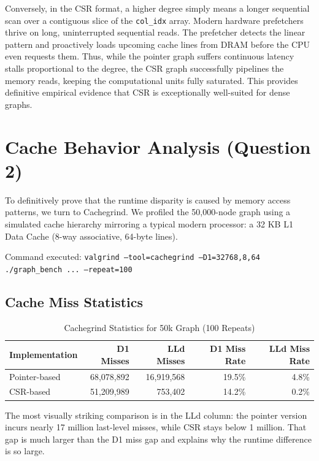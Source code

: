 \documentclass[11pt]{article}
\begin{document}
Conversely, in the CSR format, a higher degree simply means a longer sequential scan over a contiguous slice of the \texttt{col\_idx} array. Modern hardware prefetchers thrive on long, uninterrupted sequential reads. The prefetcher detects the linear pattern and proactively loads upcoming cache lines from DRAM before the CPU even requests them. Thus, while the pointer graph suffers continuous latency stalls proportional to the degree, the CSR graph successfully pipelines the memory reads, keeping the computational units fully saturated. This provides definitive empirical evidence that CSR is exceptionally well-suited for dense graphs.

\section{Cache Behavior Analysis (Question 2)}

To definitively prove that the runtime disparity is caused by memory access patterns, we turn to Cachegrind. We profiled the 50,000-node graph using a simulated cache hierarchy mirroring a typical modern processor: a 32 KB L1 Data Cache (8-way associative, 64-byte lines).

Command executed:
\texttt{valgrind --tool=cachegrind --D1=32768,8,64 ./graph\_bench ... --repeat=100}

\subsection{Cache Miss Statistics}

\begin{table}[H]
\centering
\caption{Cachegrind Statistics for 50k Graph (100 Repeats)}
\vspace{0.2cm}
\begin{tabular}{@{}lrrrr@{}}
\toprule
\textbf{Implementation} & \textbf{D1 Misses} & \textbf{LLd Misses} & \textbf{D1 Miss Rate} & \textbf{LLd Miss Rate} \\ \midrule
Pointer-based & 68,078,892 & 16,919,568 & 19.5\% & 4.8\% \\
CSR-based     & 51,209,989 & 753,402    & 14.2\% & 0.2\% \\ \bottomrule
\end{tabular}
\end{table}

The most visually striking comparison is in the LLd column: the pointer version incurs nearly 17 million last-level misses, while CSR stays below 1 million. That gap is much larger than the D1 miss gap and explains why the runtime difference is so large.
\end{document}
